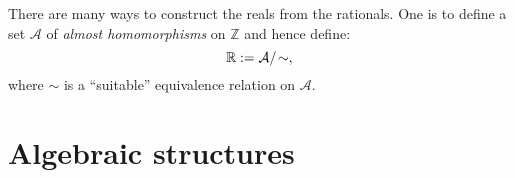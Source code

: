 \documentclass[root.tex]{subfiles}
\begin{document}
There are many ways to construct the reals from the rationals. One is to define a set $\mathcal{A}$ of \emph{almost homomorphisms} on $\mathbb{Z}$ and hence define:
$$
\mathbb{R}\index{$\mathbb{R}$} := \mathcal{A}/\!\sim,
$$
where $\sim$ is a ``suitable'' equivalence relation on $\mathcal{A}$.



\chapter{Algebraic structures}%


\end{document}
